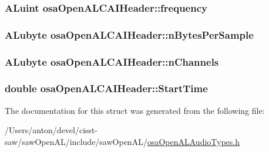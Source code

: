 \subsubsection[{frequency}]{\setlength{\rightskip}{0pt plus 5cm}A\+Luint osa\+Open\+A\+L\+C\+A\+I\+Header\+::frequency}\label{structosa_open_a_l_c_a_i_header_aaa90f7109f9686b0b3d1cfe440bb244a}
\hypertarget{structosa_open_a_l_c_a_i_header_a6856804bf471be06e7f3382088f0815f}{}
\subsubsection[{n\+Bytes\+Per\+Sample}]{\setlength{\rightskip}{0pt plus 5cm}A\+Lubyte osa\+Open\+A\+L\+C\+A\+I\+Header\+::n\+Bytes\+Per\+Sample}\label{structosa_open_a_l_c_a_i_header_a6856804bf471be06e7f3382088f0815f}
\hypertarget{structosa_open_a_l_c_a_i_header_a244fe6df719466694ffc1ccc593d54d0}{}
\subsubsection[{n\+Channels}]{\setlength{\rightskip}{0pt plus 5cm}A\+Lubyte osa\+Open\+A\+L\+C\+A\+I\+Header\+::n\+Channels}\label{structosa_open_a_l_c_a_i_header_a244fe6df719466694ffc1ccc593d54d0}
\hypertarget{structosa_open_a_l_c_a_i_header_a997c67e3b4e503cd6a374bc26c4151d9}{}
\subsubsection[{Start\+Time}]{\setlength{\rightskip}{0pt plus 5cm}double osa\+Open\+A\+L\+C\+A\+I\+Header\+::\+Start\+Time}\label{structosa_open_a_l_c_a_i_header_a997c67e3b4e503cd6a374bc26c4151d9}


The documentation for this struct was generated from the following file\+:\begin{DoxyCompactItemize}
\item 
/\+Users/anton/devel/cisst-\/saw/saw\+Open\+A\+L/include/saw\+Open\+A\+L/\hyperlink{osa_open_a_l_audio_types_8h}{osa\+Open\+A\+L\+Audio\+Types.\+h}\end{DoxyCompactItemize}
